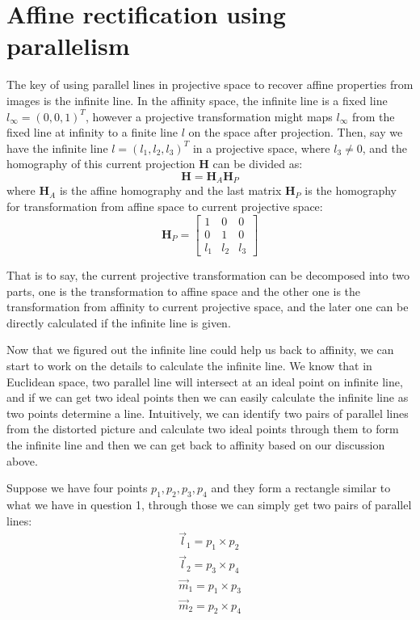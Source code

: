 \documentclass[conference]{IEEEtran}
\let\oldvec\vec
\renewcommand{\vec}[1]{\oldvec{\mathit{#1}}}
\newcommand{\mat}[1]{\mathbf{#1}} %
\begin{document}
\section{Affine rectification using parallelism}
The key of using parallel lines in projective space to recover affine properties from images is the infinite line. In the affinity space, the infinite line is a fixed line $l_{\infty} = (0, 0, 1)^T$, however a projective transformation might maps $l_{\infty}$ from the fixed line at infinity to a finite line $l$ on the space after projection. Then, say we have the infinite line $l = (l_1, l_2, l_3)^T$ in a projective space, where $l_3\neq 0$, and the homography of this current projection $\mat{H}$ can be divided as:
\begin{equation}
	\mat{H}=\mat{H}_A\mat{H}_P
\end{equation}
\noindent where $\mat{H}_A$ is the affine homography and the last matrix $\mat{H}_P$ is the homography for transformation from affine space to current projective space:
\begin{equation}
	\mat{H}_P = 
	\begin{bmatrix}
		1 & 0 & 0 \\
		0 & 1 & 0 \\
		l_1 &  l_2 & l_3
	\end{bmatrix}
\end{equation}

\noindent That is to say, the current projective transformation can be decomposed into two parts, one is the transformation to affine space and the other one is the transformation from affinity to current projective space, and the later one can be directly calculated if the infinite line is given.

Now that we figured out the infinite line could help us back to affinity, we can start to work on the details to calculate the infinite line. We know that in Euclidean space, two parallel line will intersect at an ideal point on infinite line, and if we can get two ideal points then we can easily calculate the infinite line as two points determine a line. Intuitively, we can identify two pairs of parallel lines from the distorted picture and calculate two ideal points through them to form the infinite line and then we can get back to affinity based on our discussion above.

Suppose we have four points $p_1, p_2, p_3, p_4$ and they form a rectangle similar to what we have in question 1, through those we can simply get two pairs of parallel lines:
\begin{equation}
\begin{split}
	\vec{l}_1 = p_1 \times p_2\\
	\vec{l}_2 = p_3 \times p_4\\
	\vec{m}_1 = p_1 \times p_3\\
	\vec{m}_2 = p_2 \times p_4
\end{split}
\end{equation}
\end{document}
